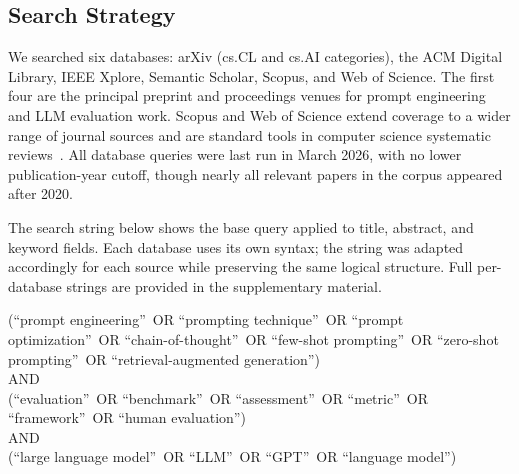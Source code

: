 \documentclass[journal]{IEEEtran}
\begin{document}
\subsection{Search Strategy}

We searched six databases: arXiv (cs.CL and cs.AI categories),
the ACM Digital Library, IEEE Xplore, Semantic Scholar, Scopus,
and Web of Science. The first four are the principal preprint and
proceedings venues for prompt engineering and LLM evaluation
work. Scopus and Web of Science extend coverage to a wider range of journal sources
and are standard tools in computer science systematic
reviews~\cite{kitchenham2007slr}. All database queries were last run in
March 2026, with no lower publication-year cutoff, though nearly
all relevant papers in the corpus appeared after 2020.

The search string below shows the base query applied to title,
abstract, and keyword fields. Each database uses its own syntax;
the string was adapted accordingly for each source while preserving
the same logical structure. Full per-database strings are provided
in the supplementary material.

\medskip
\noindent\begin{minipage}{\columnwidth}
\small
\begin{flushleft}
\ttfamily
(\textquotedblleft prompt engineering\textquotedblright~OR
\textquotedblleft prompting technique\textquotedblright~OR
\textquotedblleft prompt optimization\textquotedblright~OR
\textquotedblleft chain-of-thought\textquotedblright~OR
\textquotedblleft few-shot prompting\textquotedblright~OR
\textquotedblleft zero-shot prompting\textquotedblright~OR
\textquotedblleft retrieval-augmented generation\textquotedblright)\\[2pt]
AND\\[2pt]
(\textquotedblleft evaluation\textquotedblright~OR
\textquotedblleft benchmark\textquotedblright~OR
\textquotedblleft assessment\textquotedblright~OR
\textquotedblleft metric\textquotedblright~OR
\textquotedblleft framework\textquotedblright~OR
\textquotedblleft human evaluation\textquotedblright)\\[2pt]
AND\\[2pt]
(\textquotedblleft large language model\textquotedblright~OR
\textquotedblleft LLM\textquotedblright~OR
\textquotedblleft GPT\textquotedblright~OR
\textquotedblleft language model\textquotedblright)
\end{flushleft}
\end{minipage}
\medskip
\end{document}
